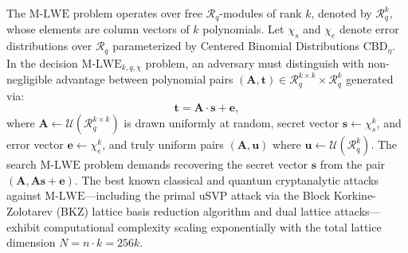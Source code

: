 The $\text{M-LWE}$ problem operates over free $\mathcal{R}_q$-modules of rank $k$, denoted by $\mathcal{R}_q^k$, whose elements are column vectors of $k$ polynomials. Let $\chi_s$ and $\chi_e$ denote error distributions over $\mathcal{R}_q$ parameterized by Centered Binomial Distributions $\text{CBD}_\eta$. In the decision $\text{M-LWE}_{k, q, \chi}$ problem, an adversary must distinguish with non-negligible advantage between polynomial pairs $(\mathbf{A}, \mathbf{t}) \in \mathcal{R}_q^{k \times k} \times \mathcal{R}_q^k$ generated via:
\begin{equation}
\label{eq:mlwe_system}
\mathbf{t} = \mathbf{A} \cdot \mathbf{s} + \mathbf{e},
\end{equation}
where $\mathbf{A} \leftarrow \mathcal{U}(\mathcal{R}_q^{k \times k})$ is drawn uniformly at random, secret vector $\mathbf{s} \leftarrow \chi_s^k$, and error vector $\mathbf{e} \leftarrow \chi_e^k$, and truly uniform pairs $(\mathbf{A}, \mathbf{u})$ where $\mathbf{u} \leftarrow \mathcal{U}(\mathcal{R}_q^k)$. The search $\text{M-LWE}$ problem demands recovering the secret vector $\mathbf{s}$ from the pair $(\mathbf{A}, \mathbf{A}\mathbf{s} + \mathbf{e})$. The best known classical and quantum cryptanalytic attacks against $\text{M-LWE}$---including the primal uSVP attack via the Block Korkine-Zolotarev (BKZ) lattice basis reduction algorithm and dual lattice attacks---exhibit computational complexity scaling exponentially with the total lattice dimension $N = n \cdot k = 256k$.

